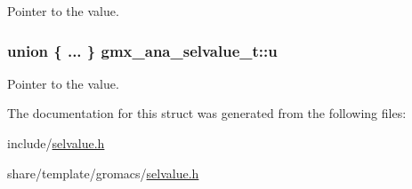 \-Pointer to the value. \hypertarget{structgmx__ana__selvalue__t_a623f44abe0246882e1d86e116b56c89c}{
\subsubsection[{u}]{\setlength{\rightskip}{0pt plus 5cm}union \{ ... \}                             {\bf gmx\-\_\-ana\-\_\-selvalue\-\_\-t\-::u}}}\label{structgmx__ana__selvalue__t_a623f44abe0246882e1d86e116b56c89c}
\-Pointer to the value. 

\-The documentation for this struct was generated from the following files\-:\begin{DoxyCompactItemize}
\item 
include/\hyperlink{include_2selvalue_8h}{selvalue.\-h}\item 
share/template/gromacs/\hyperlink{share_2template_2gromacs_2selvalue_8h}{selvalue.\-h}\end{DoxyCompactItemize}
